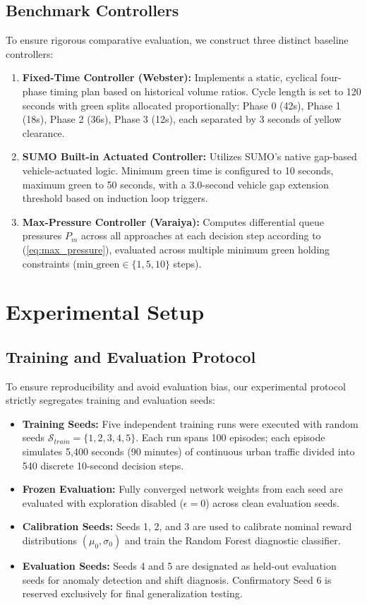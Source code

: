 \documentclass{ieeeaccess}
\begin{document}
\subsection{Benchmark Controllers}
To ensure rigorous comparative evaluation, we construct three distinct baseline controllers:
\begin{enumerate}
    \item \textbf{Fixed-Time Controller (Webster):} Implements a static, cyclical four-phase timing plan based on historical volume ratios. Cycle length is set to 120 seconds with green splits allocated proportionally: Phase 0 (42s), Phase 1 (18s), Phase 2 (36s), Phase 3 (12s), each separated by 3 seconds of yellow clearance.
    \item \textbf{SUMO Built-in Actuated Controller:} Utilizes SUMO's native gap-based vehicle-actuated logic. Minimum green time is configured to 10 seconds, maximum green to 50 seconds, with a 3.0-second vehicle gap extension threshold based on induction loop triggers.
    \item \textbf{Max-Pressure Controller (Varaiya):} Computes differential queue pressures $P_m$ across all approaches at each decision step according to (\ref{eq:max_pressure}), evaluated across multiple minimum green holding constraints ($\text{min\_green} \in \{1, 5, 10\}$ steps).
\end{enumerate}

\section{Experimental Setup}
\label{sec:experimental_setup}

\subsection{Training and Evaluation Protocol}
To ensure reproducibility and avoid evaluation bias, our experimental protocol strictly segregates training and evaluation seeds:
\begin{itemize}
    \item \textbf{Training Seeds:} Five independent training runs were executed with random seeds $\mathcal{S}_{train} = \{1, 2, 3, 4, 5\}$. Each run spans 100 episodes; each episode simulates 5,400 seconds (90 minutes) of continuous urban traffic divided into 540 discrete 10-second decision steps.
    \item \textbf{Frozen Evaluation:} Fully converged network weights from each seed are evaluated with exploration disabled ($\epsilon = 0$) across clean evaluation seeds.
    \item \textbf{Calibration Seeds:} Seeds 1, 2, and 3 are used to calibrate nominal reward distributions $(\mu_0, \sigma_0)$ and train the Random Forest diagnostic classifier.
    \item \textbf{Evaluation Seeds:} Seeds 4 and 5 are designated as held-out evaluation seeds for anomaly detection and shift diagnosis. Confirmatory Seed 6 is reserved exclusively for final generalization testing.
\end{itemize}
\end{document}
